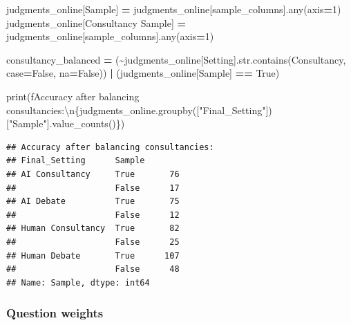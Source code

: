 \documentclass[
]{article}
\newenvironment{Shaded}{\begin{snugshade}}{\end{snugshade}}
\newcommand{\BuiltInTok}[1]{#1}
\newcommand{\CharTok}[1]{\textcolor[rgb]{0.31,0.60,0.02}{#1}}
\newcommand{\DecValTok}[1]{\textcolor[rgb]{0.00,0.00,0.81}{#1}}
\newcommand{\NormalTok}[1]{#1}
\newcommand{\OperatorTok}[1]{\textcolor[rgb]{0.81,0.36,0.00}{\textbf{#1}}}
\newcommand{\SpecialCharTok}[1]{\textcolor[rgb]{0.00,0.00,0.00}{#1}}
\newcommand{\SpecialStringTok}[1]{\textcolor[rgb]{0.31,0.60,0.02}{#1}}
\newcommand{\StringTok}[1]{\textcolor[rgb]{0.31,0.60,0.02}{#1}}
\newcommand{\VariableTok}[1]{\textcolor[rgb]{0.00,0.00,0.00}{#1}}
\begin{document}
\begin{Shaded}
\begin{Highlighting}[]
\NormalTok{judgments\_online[}\StringTok{\textquotesingle{}Sample\textquotesingle{}}\NormalTok{] }\OperatorTok{=}\NormalTok{ judgments\_online[sample\_columns].}\BuiltInTok{any}\NormalTok{(axis}\OperatorTok{=}\DecValTok{1}\NormalTok{)}
\NormalTok{judgments\_online[}\StringTok{\textquotesingle{}Consultancy Sample\textquotesingle{}}\NormalTok{] }\OperatorTok{=}\NormalTok{ judgments\_online[sample\_columns].}\BuiltInTok{any}\NormalTok{(axis}\OperatorTok{=}\DecValTok{1}\NormalTok{)}

\NormalTok{consultancy\_balanced }\OperatorTok{=}\NormalTok{ (}\OperatorTok{\textasciitilde{}}\NormalTok{judgments\_online[}\StringTok{\textquotesingle{}Setting\textquotesingle{}}\NormalTok{].}\BuiltInTok{str}\NormalTok{.contains(}\StringTok{\textquotesingle{}Consultancy\textquotesingle{}}\NormalTok{, case}\OperatorTok{=}\VariableTok{False}\NormalTok{, na}\OperatorTok{=}\VariableTok{False}\NormalTok{)) }\OperatorTok{|}\NormalTok{ (judgments\_online[}\StringTok{\textquotesingle{}Sample\textquotesingle{}}\NormalTok{] }\OperatorTok{==} \VariableTok{True}\NormalTok{)}

\BuiltInTok{print}\NormalTok{(}\SpecialStringTok{f\textquotesingle{}Accuracy after balancing consultancies:}\CharTok{\textbackslash{}n}\SpecialCharTok{\{}\NormalTok{judgments\_online}\SpecialCharTok{.}\NormalTok{groupby([}\StringTok{"Final\_Setting"}\NormalTok{])[}\StringTok{"Sample"}\NormalTok{]}\SpecialCharTok{.}\NormalTok{value\_counts()}\SpecialCharTok{\}}\SpecialStringTok{\textquotesingle{}}\NormalTok{)}
\end{Highlighting}
\end{Shaded}

\begin{verbatim}
## Accuracy after balancing consultancies:
## Final_Setting      Sample
## AI Consultancy     True       76
##                    False      17
## AI Debate          True       75
##                    False      12
## Human Consultancy  True       82
##                    False      25
## Human Debate       True      107
##                    False      48
## Name: Sample, dtype: int64
\end{verbatim}

\hypertarget{question-weights}{%
\subsubsection{Question weights}\label{question-weights}}
\end{document}
